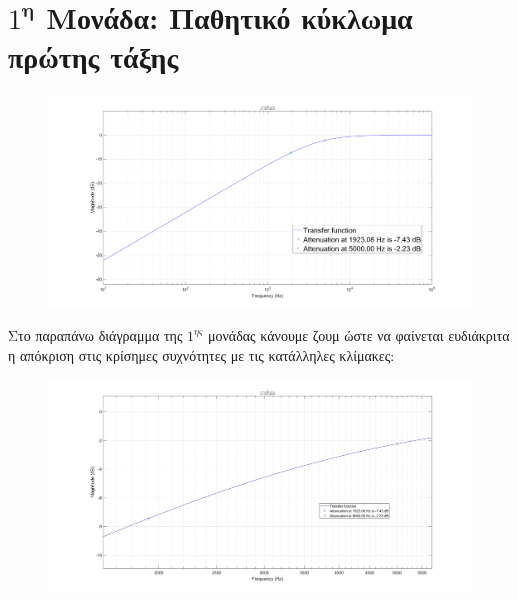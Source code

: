 \documentclass{article}
\begin{document}
{{{\section*{$1^\textbf{η}$ Μονάδα: Παθητικό κύκλωμα πρώτης τάξης } 
  \begin{figure}[h!]
\centering
 	\advance\leftskip-4cm
  \includegraphics[width=190mm,scale=2]{thema4/t1.png}
\end{figure} 
\normalsize{}
Στο παραπάνω διάγραμμα της $1^{ης}$ μονάδας κάνουμε ζουμ ώστε να φαίνεται ευδιάκριτα η απόκριση στις κρίσημες συχνότητες με τις κατάλληλες κλίμακες:
\large{}
  \begin{figure}[h!]
\centering
 	\advance\leftskip-1cm
  \includegraphics[width=120mm,scale=2]{thema4/z1.jpg}
\end{figure} 
\newpage
}}}
\end{document}

